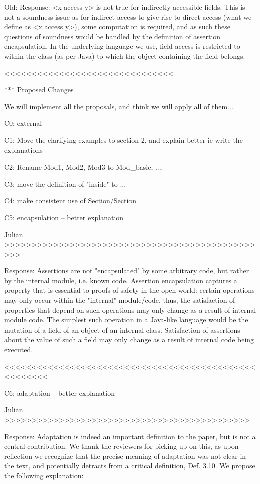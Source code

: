 Old:
Response: <x access y> is not true for indirectly accessible fields. This is not a soundness issue as for indirect access to give rise to direct access (what we define as <x access y>), some computation is required, and as such these questions of soundness would be handled by the definition of assertion encapsulation. In the underlying language we use, field access is restricted to within the class (as per Java) to which the object containing the field belongs.

<<<<<<<<<<<<<<<<<<<<<<<<<<<<<<<


*** Proposed Changes

We will implement all the proposals, and think we will apply all of them...

C0: external

C1: Move the clarifying examples to section 2, and explain better
ie write the explanations

C2: Rename Mod1, Mod2, Mod3 to Mod_{basic}, ....

C3: move the definition of "inside" to ...

C4: make consistent use of Section/Section

C5: encapsulation -- better explanation

Julian >>>>>>>>>>>>>>>>>>>>>>>>>>>>>>>>>>>>>>>>>>>>>>>>>

Response:
Assertions are not "encapsulated" by some arbitrary code, but rather by the internal module, i.e. known code. Assertion encapsulation captures a property that is essential to proofs of safety in the open world: certain operations may only occur within the "internal" module/code, thus, the satisfaction of properties that depend on such operations may only change as a result of internal module code. The simplest such operation in a Java-like language would be the mutation of a field of an object of an internal class. Satisfaction of assertions about the value of such a field may only change as a result of internal code being executed.

<<<<<<<<<<<<<<<<<<<<<<<<<<<<<<<<<<<<<<<<<<<<<<<<<<<<<<

C6: adaptation -- better explanation

Julian >>>>>>>>>>>>>>>>>>>>>>>>>>>>>>>>>>>>>>>>>>>>>

Response:
Adaptation is indeed an important definition to the paper, but is not a central contribution. We thank the reviewers for picking up on this, as upon reflection we recognize that the precise meaning of adaptation was not clear in the text, and potentially detracts from a critical definition, Def. 3.10. We propose the following explanation:

